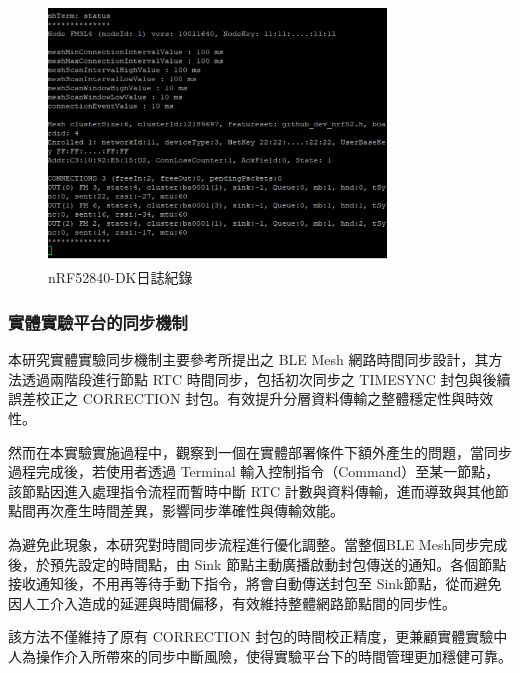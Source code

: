 \begin{ZhChapter}
\begin{figure}[H]
    \centering
    \includegraphics[width = 0.8\textwidth]{image/UART日誌紀錄.png}
    \caption{nRF52840-DK日誌紀錄}
    \label{fig: nRF52840-DK日誌紀錄}
\end{figure}


\subsubsection{實體實驗平台的同步機制}

本研究實體實驗同步機制主要參考\cite{112TIT00392032}所提出之 BLE Mesh 網路時間同步設計，其方法透過兩階段進行節點 RTC 時間同步，包括初次同步之 TIMESYNC 封包與後續誤差校正之 CORRECTION 封包。有效提升分層資料傳輸之整體穩定性與時效性。

然而在本實驗實施過程中，觀察到一個在實體部署條件下額外產生的問題，當同步過程完成後，若使用者透過 Terminal 輸入控制指令（Command）至某一節點，該節點因進入處理指令流程而暫時中斷 RTC 計數與資料傳輸，進而導致與其他節點間再次產生時間差異，影響同步準確性與傳輸效能。

為避免此現象，本研究對時間同步流程進行優化調整。當整個BLE Mesh同步完成後，於預先設定的時間點，由 Sink 節點主動廣播啟動封包傳送的通知。各個節點接收通知後，不用再等待手動下指令，將會自動傳送封包至 Sink節點，從而避免因人工介入造成的延遲與時間偏移，有效維持整體網路節點間的同步性。

該方法不僅維持了原有 CORRECTION 封包的時間校正精度，更兼顧實體實驗中人為操作介入所帶來的同步中斷風險，使得實驗平台下的時間管理更加穩健可靠。



\end{ZhChapter}
